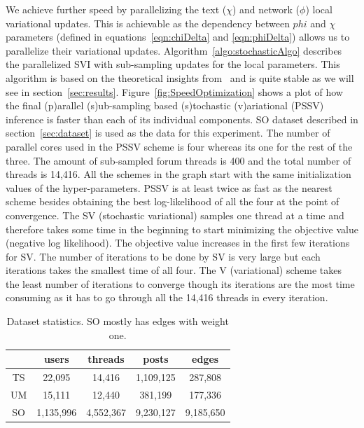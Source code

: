 \documentclass{sig-alternate}
\begin{document}
We achieve further speed by parallelizing the text ($\chi$) and network
($\phi$) local variational updates. This is achievable  as the
dependency between $phi$ and $\chi$ parameters (defined in
equations~\ref{eqn:chiDelta} and \ref{eqn:phiDelta}) allows us to parallelize their
variational updates.
Algorithm~\ref{algo:stochasticAlgo} describes the parallelized SVI with
sub-sampling updates for the local parameters. This algorithm is 
based on the theoretical insights from~\cite{Hoffman:2013:SVI} and is 
quite stable as we will see in section~\ref{sec:results}. 
Figure~\ref{fig:SpeedOptimization} 
shows a plot of how the final (p)arallel (s)ub-sampling based (s)tochastic
(v)ariational (PSSV) inference is faster than each of its individual components.
SO dataset described in section~\ref{sec:dataset} is used as the data for this 
experiment.
The number of parallel cores used in the PSSV scheme is four whereas its one
for the rest of the three.
The amount of sub-sampled forum threads is 400 and the total number of threads is 14,416.
All the schemes in the graph start with the same initialization values of the
hyper-parameters. PSSV is at least twice as fast as the nearest scheme besides
obtaining the best log-likelihood of all the four at the point of convergence.
The SV (stochastic variational) samples one thread at a time and therefore
takes some time in the beginning to start minimizing the objective value
(negative log likelihood).
The objective value increases in the first few iterations for SV. The number of
iterations to be done by SV is very large but each iterations takes the smallest time of
all four. The V (variational) scheme takes the least number of iterations to
converge though its iterations are the most time consuming as it has to go
through all the 14,416 threads in every iteration. 


\begin{table}
\begin{center}
\begin{tabular}{c|c|c|c|c|}
 & users & threads & posts & edges\\\hline
 TS & 22,095 & 14,416 & 1,109,125 & 287,808\\\hline
 UM & 15,111 & 12,440 & 381,199 & 177,336\\\hline
 SO & 1,135,996 & 4,552,367 & 9,230,127 & 9,185,650\\\hline
\end{tabular}
\label{tab:dataStats}
\end{center}
\caption{Dataset statistics. SO mostly has edges with weight one.}
\end{table}
\end{document}
